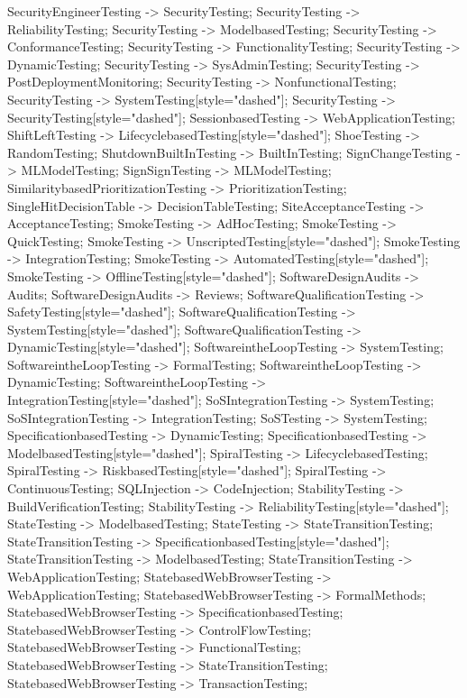 \documentclass{article}
\begin{document}
{SecurityEngineerTesting -> SecurityTesting;
SecurityTesting -> ReliabilityTesting;
SecurityTesting -> ModelbasedTesting;
SecurityTesting -> ConformanceTesting;
SecurityTesting -> FunctionalityTesting;
SecurityTesting -> DynamicTesting;
SecurityTesting -> SysAdminTesting;
SecurityTesting -> PostDeploymentMonitoring;
SecurityTesting -> NonfunctionalTesting;
SecurityTesting -> SystemTesting[style="dashed"];
SecurityTesting -> SecurityTesting[style="dashed"];
SessionbasedTesting -> WebApplicationTesting;
ShiftLeftTesting -> LifecyclebasedTesting[style="dashed"];
ShoeTesting -> RandomTesting;
ShutdownBuiltInTesting -> BuiltInTesting;
SignChangeTesting -> MLModelTesting;
SignSignTesting -> MLModelTesting;
SimilaritybasedPrioritizationTesting -> PrioritizationTesting;
SingleHitDecisionTable -> DecisionTableTesting;
SiteAcceptanceTesting -> AcceptanceTesting;
SmokeTesting -> AdHocTesting;
SmokeTesting -> QuickTesting;
SmokeTesting -> UnscriptedTesting[style="dashed"];
SmokeTesting -> IntegrationTesting;
SmokeTesting -> AutomatedTesting[style="dashed"];
SmokeTesting -> OfflineTesting[style="dashed"];
SoftwareDesignAudits -> Audits;
SoftwareDesignAudits -> Reviews;
SoftwareQualificationTesting -> SafetyTesting[style="dashed"];
SoftwareQualificationTesting -> SystemTesting[style="dashed"];
SoftwareQualificationTesting -> DynamicTesting[style="dashed"];
SoftwareintheLoopTesting -> SystemTesting;
SoftwareintheLoopTesting -> FormalTesting;
SoftwareintheLoopTesting -> DynamicTesting;
SoftwareintheLoopTesting -> IntegrationTesting[style="dashed"];
SoSIntegrationTesting -> SystemTesting;
SoSIntegrationTesting -> IntegrationTesting;
SoSTesting -> SystemTesting;
SpecificationbasedTesting -> DynamicTesting;
SpecificationbasedTesting -> ModelbasedTesting[style="dashed"];
SpiralTesting -> LifecyclebasedTesting;
SpiralTesting -> RiskbasedTesting[style="dashed"];
SpiralTesting -> ContinuousTesting;
SQLInjection -> CodeInjection;
StabilityTesting -> BuildVerificationTesting;
StabilityTesting -> ReliabilityTesting[style="dashed"];
StateTesting -> ModelbasedTesting;
StateTesting -> StateTransitionTesting;
StateTransitionTesting -> SpecificationbasedTesting[style="dashed"];
StateTransitionTesting -> ModelbasedTesting;
StateTransitionTesting -> WebApplicationTesting;
StatebasedWebBrowserTesting -> WebApplicationTesting;
StatebasedWebBrowserTesting -> FormalMethods;
StatebasedWebBrowserTesting -> SpecificationbasedTesting;
StatebasedWebBrowserTesting -> ControlFlowTesting;
StatebasedWebBrowserTesting -> FunctionalTesting;
StatebasedWebBrowserTesting -> StateTransitionTesting;
StatebasedWebBrowserTesting -> TransactionTesting;
}
\end{document}
